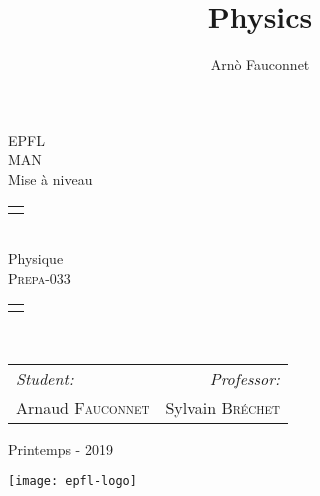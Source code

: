 \documentclass[
    11pt,
    a4paper,
    oneside,
    headinlcude, footinclude,
    twoside,
]{report}
\title{Physics}
\author{Arnò Fauconnet}
\begin{document}
\begin{titlepage}
   \begin{center}
       \vspace*{\fill}

       {\Huge EPFL}\\ 
       \vfill
       {\huge MAN}\\ [1em]
       {\Large Mise à niveau}\\
        \vfill
        \begin{tabularx}{\textwidth}{X}
            \Xhline{3\arrayrulewidth}\\
        \end{tabularx}\\ [2em]
        {\Huge Physique} \\ [1em]
        \textsc{\huge Prepa-033} \\ [2em]
        \begin{tabularx}{\textwidth}{X}
            \Xhline{3\arrayrulewidth}\\
        \end{tabularx}\\ [2em]
        \vspace{.7cm}
        {\large
        \begin{tabularx}{.9\textwidth}{Xr}
            \textit{Student:} & \textit{Professor:}\\
            Arnaud \textsc{Fauconnet} & Sylvain \textsc{Bréchet}
        \end{tabularx}}
        \vfill
        {\Large Printemps - 2019}

        \vfill
        \texttt{[image: epfl-logo]}

       \vfill
   \end{center} 
\end{titlepage}


\end{document}
